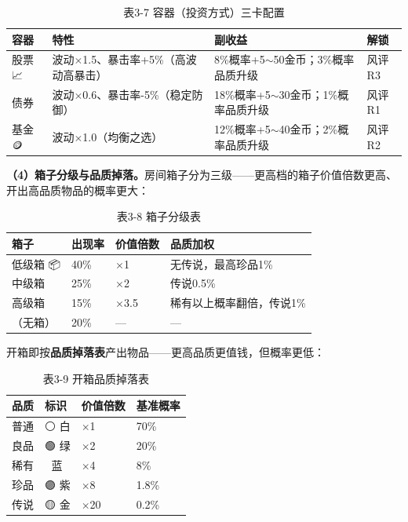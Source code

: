 \documentclass[12pt,a4paper]{ctexart}
\begin{document}
\begin{table}[htbp]
\centering
\begin{tabular}{p{2cm}p{4.4cm}p{3.2cm}p{3cm}}
\toprule
\textbf{容器} & \textbf{特性} & \textbf{副收益} & \textbf{解锁} \\
\midrule
股票 📈 & 波动$\times$1.5、暴击率+5\%（高波动高暴击） & 8\%概率+5$\sim$50金币；3\%概率品质升级 & 风评R3 \\
债券 📜 & 波动$\times$0.6、暴击率-5\%（稳定防御） & 18\%概率+5$\sim$30金币；1\%概率品质升级 & 风评R1 \\
基金 🪙 & 波动$\times$1.0（均衡之选） & 12\%概率+5$\sim$40金币；2\%概率品质升级 & 风评R2 \\
\bottomrule
\end{tabular}
\caption*{表3-7 \quad 容器（投资方式）三卡配置}
\end{table}

\textbf{（4）箱子分级与品质掉落。}房间箱子分为三级——更高档的箱子价值倍数更高、开出高品质物品的概率更大：

\begin{table}[htbp]
\centering
\begin{tabular}{p{2.6cm}p{2.2cm}p{3.4cm}p{3cm}}
\toprule
\textbf{箱子} & \textbf{出现率} & \textbf{价值倍数} & \textbf{品质加权} \\
\midrule
低级箱 📦 & 40\% & $\times$1 & 无传说，最高珍品1\% \\
中级箱 🧰 & 25\% & $\times$2 & 传说0.5\% \\
高级箱 👑 & 15\% & $\times$3.5 & 稀有以上概率翻倍，传说1\% \\
（无箱） & 20\% & — & — \\
\bottomrule
\end{tabular}
\caption*{表3-8 \quad 箱子分级表}
\end{table}

开箱即按\textbf{品质掉落表}产出物品——更高品质更值钱，但概率更低：

\begin{table}[htbp]
\centering
\begin{tabular}{p{2.2cm}p{2cm}p{2.4cm}p{2.6cm}}
\toprule
\textbf{品质} & \textbf{标识} & \textbf{价值倍数} & \textbf{基准概率} \\
\midrule
普通 & ⚪ 白 & $\times$1 & 70\% \\
良品 & 🟢 绿 & $\times$2 & 20\% \\
稀有 & 🔵 蓝 & $\times$4 & 8\% \\
珍品 & 🟣 紫 & $\times$8 & 1.8\% \\
传说 & 🟡 金 & $\times$20 & 0.2\% \\
\bottomrule
\end{tabular}
\caption*{表3-9 \quad 开箱品质掉落表}
\end{table}
\end{document}
